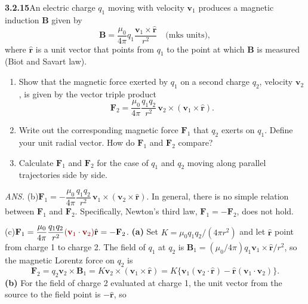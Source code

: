 \par\bigskip
\noindent\textbf{3.2.15}\quad An electric charge $q_{1}$ moving with velocity
$\mathbf{v}_{1}$ produces a magnetic induction $\mathbf{B}$ given by
\[
\mathbf{B}=\frac{\mu_{0}}{4\pi}q_{1}\frac{\mathbf{v}_{1}\times\hat{\mathbf{r}}}
{r^{2}}\quad\text{(mks units)},
\]
where $\hat{\mathbf{r}}$ is a unit vector that points from $q_{1}$ to the
point at which $\mathbf{B}$ is measured (Biot and Savart law).
\begin{enumerate}
\item[(a)] Show that the magnetic force exerted by $q_{1}$ on a second charge
  $q_{2}$, velocity $\mathbf{v}_{2}$, is given by the vector triple product
  \[
  \mathbf{F}_{2}=\frac{\mu_{0}}{4\pi}\frac{q_{1}q_{2}}{r^{2}}\,
  \mathbf{v}_{2}\times(\mathbf{v}_{1}\times\hat{\mathbf{r}}).
  \]
\item[(b)] Write out the corresponding magnetic force $\mathbf{F}_{1}$ that
  $q_{2}$ exerts on $q_{1}$. Define your unit radial vector. How do
  $\mathbf{F}_{1}$ and $\mathbf{F}_{2}$ compare?
\item[(c)] Calculate $\mathbf{F}_{1}$ and $\mathbf{F}_{2}$ for the case of
  $q_{1}$ and $q_{2}$ moving along parallel trajectories side by side.
\end{enumerate}
\par\nobreak\hfill\emph{ANS.}\enspace
(b)\enspace$\mathbf{F}_{1}=-\dfrac{\mu_{0}}{4\pi}\dfrac{q_{1}q_{2}}{r^{2}}\,
\mathbf{v}_{1}\times(\mathbf{v}_{2}\times\hat{\mathbf{r}})$.\enspace
In general, there is no simple relation between $\mathbf{F}_{1}$ and
$\mathbf{F}_{2}$. Specifically, Newton's third law,
$\mathbf{F}_{1}=-\mathbf{F}_{2}$, does not hold.\par
\nobreak\hfill(c)\enspace$\mathbf{F}_{1}=\dfrac{\mu_{0}}{4\pi}
\dfrac{q_{1}q_{2}}{r^{2}}\erratum{(\mathbf v_1\cdot\mathbf v_2)}\hat{\mathbf{r}}=-\mathbf{F}_{2}$.\enspace
{}
\solution
\textbf{(a)} Set $K=\mu_0q_1q_2/(4\pi r^2)$ and let $\hat{\mathbf r}$
point from charge 1 to charge 2. The field of $q_1$ at $q_2$ is
$\mathbf B_1=(\mu_0/4\pi)q_1\mathbf v_1\times\hat{\mathbf r}/r^2$, so
the magnetic Lorentz force on $q_2$ is
\[
\mathbf F_2=q_2\mathbf v_2\times\mathbf B_1
=K\mathbf v_2\times(\mathbf v_1\times\hat{\mathbf r})
=K\{\mathbf v_1(\mathbf v_2\cdot\hat{\mathbf r})
-\hat{\mathbf r}(\mathbf v_1\cdot\mathbf v_2)\}.
\]
\textbf{(b)} For the field of charge 2 evaluated at charge 1, the unit
vector from the source to the field point is $-\hat{\mathbf r}$, so
